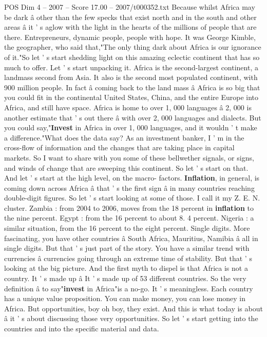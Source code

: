 \begin{textsample}{POS Dim 4 – 2007 – Score 17.00 – 2007/t000352.txt}
Because whilst Africa may be dark â other than the few specks that exist north and in the south and other areas â it ' s aglow with the light in the hearts of the millions of people that are there.
Entrepreneurs, dynamic people, people with hope.
It was George Kimble, the geographer, who said that,"The only thing dark about Africa is our ignorance of it."So let ' s start shedding light on this amazing eclectic continent that has so much to offer.
Let ' s start unpacking it.
Africa is the second-largest continent, a landmass second from Asia.
It also is the second most populated continent, with 900 million people.
In fact â coming back to the land mass â Africa is so big that you could fit in the continental United States, China, and the entire Europe into Africa, and still have space.
Africa is home to over 1, 000 languages â 2, 000 is another estimate that ' s out there â with over 2, 000 languages and dialects.
But you could say,"\textbf{Invest} in Africa in over 1, 000 languages, and it wouldn ' t make a difference."What does the data say?
As an investment banker, I ' m in the cross-flow of information and the changes that are taking place in capital markets.
So I want to share with you some of these bellwether signals, or signs, and winds of change that are sweeping this continent.
So let ' s start on that.
And let ' s start at the high level, on the macro- factors. \textbf{Inflation}, in general, is coming down across Africa â that ' s the first sign â in many countries reaching double-digit figures.
So let ' s start looking at some of those.
I call it my Z.
E.
N. cluster.
Zambia : from 2004 to 2006, moves from the 18 percent in \textbf{inflation} to the nine percent.
Egypt : from the 16 percent to about 8. 4 percent.
Nigeria : a similar situation, from the 16 percent to the eight percent.
Single digits.
More fascinating, you have other countries â South Africa, Mauritius, Namibia â all in single digits.
But that ' s just part of the story.
You have a similar trend with currencies â currencies going through an extreme time of stability.
But that ' s looking at the big picture.
And the first myth to dispel is that Africa is not a country.
It ' s made up â It ' s made up of 53 different countries.
So the very definition â to say"\textbf{invest} in Africa"is a no-go.
It ' s meaningless.
Each country has a unique value proposition.
You can make money, you can lose money in Africa.
But opportunities, boy oh boy, they exist.
And this is what today is about â it ' s about discussing those very opportunities.
So let ' s start getting into the countries and into the specific material and data.

\end{textsample}
